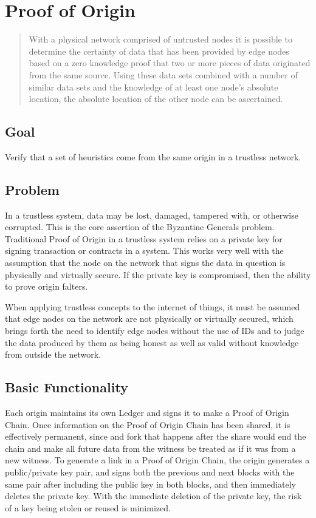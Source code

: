 \documentclass{article}
\begin{document}
\clearpage
\section {Proof of Origin}

\begin{abstract}
With a physical network comprised of untrusted nodes it is possible to determine the certainty of data that has been provided by edge nodes based on a zero knowledge proof that two or more pieces of data originated from the same source.  Using these data sets combined with a number of similar data sets and the knowledge of at least one node's absolute location, the absolute location of the other node can be ascertained.
\end{abstract}

\subsection {Goal}
Verify that a set of heuristics come from the same origin in a trustless network.

\subsection {Problem}
In a trustless system, data may be lost, damaged, tampered with, or otherwise corrupted.  This is the core assertion of the Byzantine Generals problem.  Traditional Proof of Origin in a trustless system relies on a private key for signing transaction or contracts in a system.  This works very well with the assumption that the node on the network that signs the data in question is physically and virtually secure.  If the private key is compromised, then the ability to prove origin falters.

When applying trustless concepts to the internet of things, it must be assumed that edge nodes on the network are not physically or virtually secured, which brings forth the need to identify edge nodes without the use of IDs and to judge the data produced by them as being honest as well as valid without knowledge from outside the network. 

\subsection {Basic Functionality}
Each origin maintains its own Ledger and signs it to make a Proof of Origin Chain. Once information on the Proof of Origin Chain has been shared, it is effectively permanent, since and fork that happens after the share would end the chain and make all future data from the witness be treated as if it was from a new witness.
To generate a link in a Proof of Origin Chain, the origin generates a public/private key pair, and signs both the previous and next blocks with the same pair after including the public key in both blocks, and then immediately deletes the private key.  With the immediate deletion of the private key, the risk of a key being stolen or reused is minimized.
\end{document}
